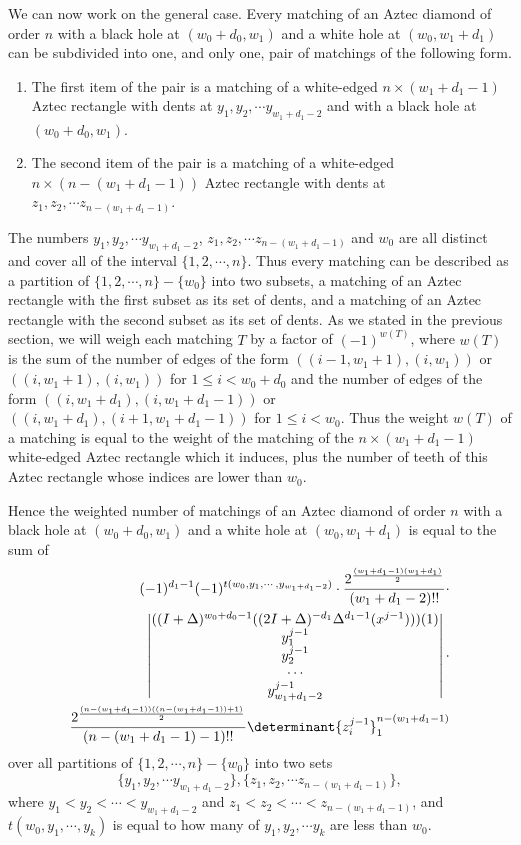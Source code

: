 \documentclass[10pt,reqno]{amsart}
\theoremstyle{plain}
\theoremstyle{definition}
\theoremstyle{remark}
\begin{document}
We can now work on the general case. Every matching of an
Aztec diamond of order $n$ with a black hole
at $(w_0+d_0,w_1)$ and a white hole at
$(w_0,w_1+d_1)$ can be subdivided
into one, and only one, pair of matchings of the following form.
\begin{enumerate}
\item The first item of the pair is a matching of a white-edged
$n\times (w_1+d_1-1)$ Aztec rectangle with dents at 
$y_1,y_2,\dotsb y_{w_1+d_1-2}$ and with a black hole at $(w_0+d_0,w_1)$.
\item The second item of the pair is a matching of a white-edged
$n\times (n-(w_1+d_1-1))$ Aztec rectangle with dents at 
$z_1,z_2,\dotsb z_{n-(w_1+d_1-1)}$. 
\end{enumerate}
The numbers $y_1,y_2,\dotsb y_{w_1+d_1-2}$,
$z_1,z_2,\dotsb z_{n-(w_1+d_1-1)}$ and $w_0$ are all distinct and cover all
of the interval $\{1,2,\dotsb ,n\}$. Thus every matching can be
described as a partition of $\{1,2,\dotsb ,n\}-\{w_0\}$ into two subsets,
a matching of an Aztec rectangle with the first subset as its set of dents,
and 
a matching of an Aztec rectangle with the second subset as its set of dents.
As we stated in the
previous section, we will weigh each matching $T$
 by a factor of $(-1)^{w(T)}$, where
$w(T)$ is the sum of the number of edges of the form
$((i-1,w_1+1),(i,w_1))$ or $((i,w_1+1),(i,w_1))$ for $1\leq i<w_0+d_0$
and the number of edges of the form
$((i,w_1+d_1),(i,w_1+d_1-1))$ or $((i,w_1+d_1),(i+1,w_1+d_1-1))$
for $1\leq i<w_0$. Thus
the weight $w(T)$ of a matching is equal to the weight of the matching
of the $n\times (w_1+d_1-1)$ white-edged Aztec rectangle which it induces, plus
the number of teeth of this Aztec rectangle whose indices are lower
than $w_0$.

Hence the weighted number of matchings of an Aztec diamond of order $n$ with a
 black hole at $(w_0+d_0,w_1)$ and a white hole at $(w_0,w_1+d_1)$
is equal to the sum of
\begin{equation}
\begin{aligned}
(-1)^{d_1-1} (-1)^{t(w_0,y_1,\dotsb,y_{w_1+d_1-2})}\cdot
\frac{2^{\frac{(w_1+d_1-1)(w_1+d_1)}{2}}}{(w_1+d_1-2)!!}\cdot \\
\begin{vmatrix}
((I+\Delta)^{w_0+d_0-1}((2I+\Delta)^{-d_1}\Delta^{d_1-1}(x^{j-1})))(1) \\
y_1^{j-1} \\
y_2^{j-1} \\
\dotsb \\
y_{w_1+d_1-2}^{j-1} 
\end{vmatrix}
\cdot \\
\frac{2^{\frac{(n-(w_1+d_1-1))((n-(w_1+d_1-1))+1)}{2}}}
	{(n-(w_1+d_1-1)-1)!!} 
\determinant{z_i^{j-1}}_1^{n-(w_1+d_1-1)}
\end{aligned}
\end{equation}
over all partitions of $\{1,2,\dotsb ,n\} - \{ w_0 \}$ into two sets
\[\{y_1,y_2,\dotsb y_{w_1+d_1-2}\}, \{z_1,z_2,\dotsb z_{n-(w_1+d_1-1)}\},\]
where 
$y_1<y_2<\dotsb <y_{w_1+d_1-2}$ and
$z_1<z_2<\dotsb <z_{n-(w_1+d_1-1)}$, and 
$t(w_0,y_1,\dotsb,y_k)$ is equal to how many of $y_1,y_2,\dotsb y_k$ are
less than $w_0$.
\end{document}
